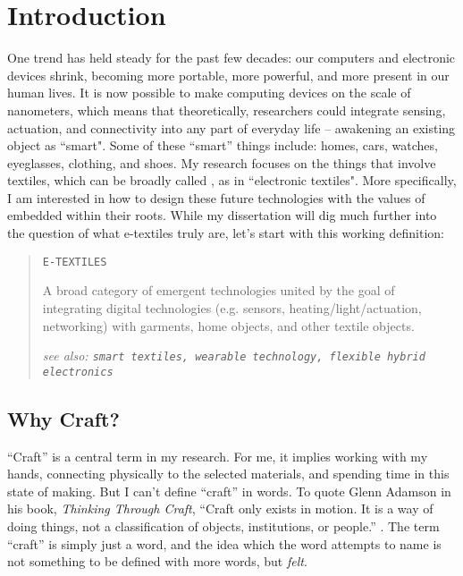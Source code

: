 \chapter{Introduction}
\label{ch-intro}


One trend has held steady for the past few decades: our computers and electronic devices shrink, becoming more portable, more powerful, and more present in our human lives. It is now possible to make computing devices on the scale of nanometers, which means that theoretically, researchers could integrate sensing, actuation, and connectivity into any part of everyday life -- awakening an existing object as ``smart". Some of these ``smart'' things include: homes, cars, watches, eyeglasses, clothing, and shoes. My research focuses on the things that involve textiles, which can be broadly called , as in ``electronic textiles". More specifically, I am interested in how to design these future technologies with the values of  embedded within their roots. While my dissertation will dig much further into the question of what e-textiles truly are, let's start with this working definition:

\begin{quote}
  \texttt{E-TEXTILES}

  A broad category of emergent technologies united by the goal of integrating digital technologies (e.g. sensors, heating/light/actuation, networking) with garments, home objects, and other textile objects.

  \textit{see also: \texttt{smart textiles, wearable technology, flexible hybrid electronics}}
\end{quote}

\section{Why Craft?}

``Craft'' is a central term in my research. For me, it implies working with my hands, connecting physically to the selected materials, and spending time in this state of making. But I can't define ``craft'' in words. To quote Glenn Adamson in his book, \textit{Thinking Through Craft}, ``Craft only exists in motion. It is a way of doing things, not a classification of objects, institutions, or people.'' \cite{adamson_thinking_2019}. The term ``craft'' is simply just a word, and the idea which the word attempts to name is not something to be defined with more words, but \textit{felt}. 

